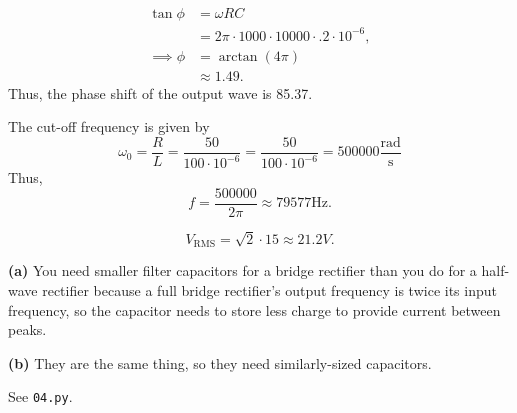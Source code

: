 \documentclass{article}
\begin{document}
\begin{align*}
    \tan\phi &= \omega RC \\
             &= 2\pi\cdot1000\cdot10000\cdot.2\cdot10^{-6}, \\
    \implies \phi &= \arctan(4\pi) \\
                  &\approx 1.49.
\end{align*}
Thus, the phase shift of the output wave is 85.37\degree.

\newpage{}

The cut-off frequency is given by $$\omega_0 = \frac RL = \frac{50}{100\cdot10^{-6}} = \frac{50}{100\cdot10^{-6}} = 500000 \frac{\text{rad}}{\text{s}}$$
Thus, $$f = \frac{500000}{2\pi} \approx 79577\text{Hz}.$$

\newpage{}


\newpage{}


\newpage{}

    $$V_{\text{RMS}} = \sqrt2 \cdot 15 \approx 21.2V.$$

\newpage{}

    {\bf (a)} You need smaller filter capacitors for a bridge rectifier than you do for a half-wave rectifier because a full bridge rectifier's output frequency is twice its input frequency, so the capacitor needs to store less charge to provide current between peaks.

    {\bf (b)} They are the same thing, so they need similarly-sized capacitors.

\newpage{}

\newpage{}

See \texttt{04.py}.

\newpage{}
\end{document}
